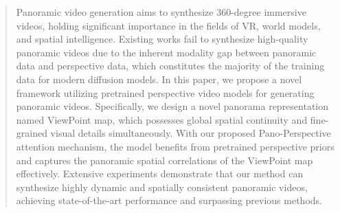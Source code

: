 \begin{abstract}
Panoramic video generation aims to synthesize 360-degree immersive videos, holding significant importance in the fields of VR, world models, and spatial intelligence. 
%
Existing works fail to synthesize high-quality panoramic videos due to the inherent modality gap between panoramic data and perspective data, which constitutes the majority of the training data for modern diffusion models.
%
In this paper, we propose a novel framework utilizing pretrained perspective video models for generating panoramic videos.
%
Specifically, we design a novel panorama representation named ViewPoint map, which possesses global spatial continuity and fine-grained visual details simultaneously.
%
With our proposed Pano-Perspective attention mechanism, the model benefits from pretrained perspective priors and captures the panoramic spatial correlations of the ViewPoint map effectively.
%
Extensive experiments demonstrate that our method can synthesize highly dynamic and spatially consistent panoramic videos, achieving state-of-the-art performance and surpassing previous methods.

\end{abstract}